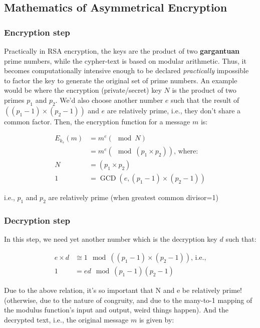 \subsection{Mathematics of Asymmetrical Encryption}
\subsubsection{Encryption step}
\vspace{-10pt}
Practically in RSA encryption, the keys are the product of two \textbf{gargantuan} prime numbers, while the cypher-text is based on modular arithmetic. Thus, it becomes computationally intensive enough to be declared \textit{practically} impossible to factor the key to generate the original set of prime numbers. An example would be where the encryption (private/secret) key $N$ is the product of two primes $p_1$ and $p_2$. We'd also choose another number $e$ such that the result of $((p_1-1) \times (p_2-1))$ and $e$ are relatively prime, i.e., they don't share a common factor. Then, the encryption function for a message $m$ is:

\begin{align}
	E_{k_s}(m) &= m^e(\mod N) \\
	&= m^e(\mod (p_1 \times p_2)) \text{, where:} \\
	N &= (p_1 \times p_2) \\
	1 &= \operatorname{GCD}(e,(p_1-1) \times (p_2-1))
\end{align}
\vspace{-35pt} 
\begin{center}
	i.e., $p_1$ and $p_2$ are relatively prime (when greatest common divisor=1)
\end{center}

\subsubsection{Decryption step}
\vspace{-10pt}
In this step, we need yet another number which is the decryption key $d$ such that:

\begin{align}
	e \times d &\cong 1\mod ((p_1 -1) \times (p_2 - 1)) \text{, i.e.,} \\
	1 &= ed \mod (p_1-1)(p_2-1)
\end{align}

\noindent
Due to the above relation, it's so important that N and e be relatively prime! (otherwise, due to the nature of congruity, and due to the many-to-1 mapping of the modulus function's input and output, weird things happen). And the decrypted text, i.e., the original message $m$ is given by:

